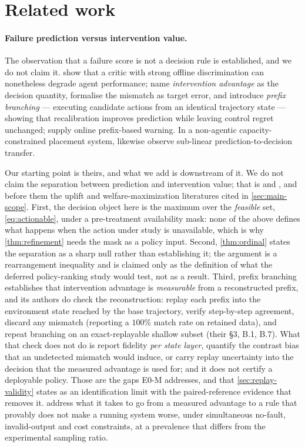 \section{Related work}
\label{sec:related}

\paragraph{Failure prediction versus intervention value.}
The observation that a failure score is not a decision rule is established, and
we do not claim it.  \citet{interventionparadox2026} show that a critic with
strong offline discrimination can nonetheless degrade agent performance;
\citet{calibrationnotcontrol2026} name \emph{intervention advantage} as the
decision quantity, formalise the mismatch as target error, and introduce
\emph{prefix branching} --- executing candidate actions from an identical
trajectory state --- showing that recalibration improves prediction while
leaving control regret unchanged; \citet{agentforesight2026} supply online
prefix-based warning.  In a non-agentic capacity-constrained placement system,
\citet{fleda2026} likewise observe sub-linear prediction-to-decision transfer.

Our starting point is theirs, and what we add is downstream of it.  We do not
claim the separation between prediction and intervention value; that is
\citet{interventionparadox2026} and \citet{calibrationnotcontrol2026}, and
before them the uplift and welfare-maximization literatures cited in
\cref{sec:main-scope}.  First, the decision object here is the maximum over the
\emph{feasible} set, \eqref{eq:actionable}, under a pre-treatment availability
mask: none of the above defines what happens when the action under study is
unavailable, which is why \cref{thm:refinement} needs the mask as a policy
input.  Second, \cref{thm:ordinal} states the separation as a sharp null rather
than establishing it; the argument is a rearrangement inequality and is claimed
only as the definition of what the deferred policy-ranking study would test,
not as a result.  Third,
prefix branching establishes that intervention advantage is \emph{measurable}
from a reconstructed prefix, and its authors do check the reconstruction:
\citet{calibrationnotcontrol2026} replay each prefix into the environment state
reached by the base trajectory, verify step-by-step agreement, discard any
mismatch (reporting a $100\%$ match rate on retained data), and repeat
branching on an exact-replayable shallow subset (their \S3, B.1, B.7).  What
that check does not do is report fidelity \emph{per state layer}, quantify the
contrast bias that an undetected mismatch would induce, or carry replay
uncertainty into the decision that the measured advantage is used for; and it
does not certify a deployable policy.  Those are the gaps E0-M addresses, and
that \cref{sec:replay-validity} states as an identification limit
with the paired-reference evidence that removes it.   address
what it takes to go from a measured advantage to a rule that provably does not
make a running system worse, under simultaneous no-fault, invalid-output and
cost constraints, at a prevalence that differs from the experimental sampling
ratio.

